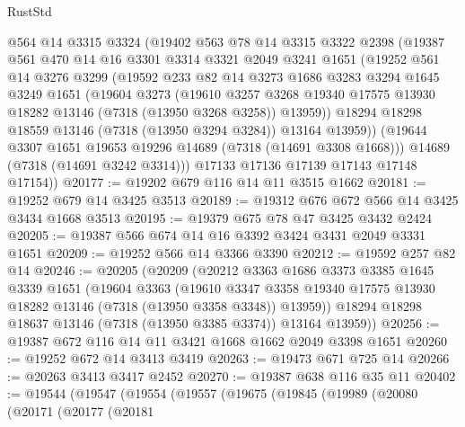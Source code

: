 \begin{lexlean}{RustStd}
\begin{coremodule}
      @564
      @14
      @3315
      @3324
      (@19402
        @563
        @78
        @14
        @3315
        @3322
        @2398
        (@19387
          @561
          @470
          @14
          @16
          @3301
          @3314
          @3321
          @2049
          @3241
          @1651
          (@19252
            @561
            @14
            @3276
            @3299
            (@19592
              @233
              @82
              @14
              @3273
              @1686
              @3283
              @3294
              @1645
              @3249
              @1651
              (@19604
                @3273
                (@19610
                  @3257
                  @3268
                  @19340
                  @17575
                  @13930
                  @18282
                  @13146
                  (@7318 (@13950 @3268 @3258))
                  @13959))
              @18294
              @18298
              @18559
              @13146
              (@7318 (@13950 @3294 @3284))
              @13164
              @13959))
          (@19644 @3307 @1651 @19653 @19296 @14689 (@7318 (@14691 @3308 @1668)))
          @14689
          (@7318 (@14691 @3242 @3314)))
        @17133
        @17136
        @17139
        @17143
        @17148
        @17154))
@20177 := @19202 @679 @116 @14 @11 @3515 @1662
@20181 := @19252 @679 @14 @3425 @3513
@20189 := @19312 @676 @672 @566 @14 @3425 @3434 @1668 @3513
@20195 := @19379 @675 @78 @47 @3425 @3432 @2424
@20205 := @19387 @566 @674 @14 @16 @3392 @3424 @3431 @2049 @3331 @1651
@20209 := @19252 @566 @14 @3366 @3390
@20212 := @19592 @257 @82 @14
@20246 := @20205
    (@20209
      (@20212
        @3363
        @1686
        @3373
        @3385
        @1645
        @3339
        @1651
        (@19604
          @3363
          (@19610
            @3347
            @3358
            @19340
            @17575
            @13930
            @18282
            @13146
            (@7318 (@13950 @3358 @3348))
            @13959))
        @18294
        @18298
        @18637
        @13146
        (@7318 (@13950 @3385 @3374))
        @13164
        @13959))
@20256 := @19387 @672 @116 @14 @11 @3421 @1668 @1662 @2049 @3398 @1651
@20260 := @19252 @672 @14 @3413 @3419
@20263 := @19473 @671 @725 @14
@20266 := @20263 @3413 @3417 @2452
@20270 := @19387 @638 @116 @35 @11
@20402 := @19544
    (@19547
      (@19554
        (@19557
          (@19675
            (@19845
              (@19989
                (@20080
                  (@20171
                    (@20177
                      (@20181

\end{coremodule}
\end{lexlean}

